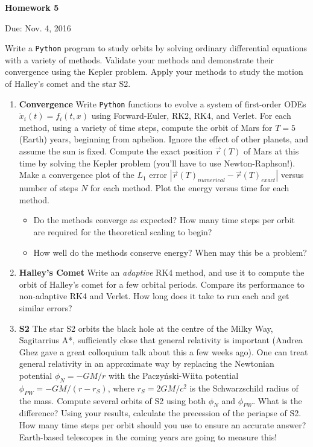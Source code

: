 \documentclass{article}
\newcommand{\Python}{{\texttt{Python}}}
\begin{document}
\begin{center}

\vspace*{-2.5cm}
\LARGE
\bf{Homework 5}
\vspace{1cm}

\large{Due: Nov. 4, 2016}
\vspace{1cm}

\end{center}

Write a \Python{} program to study orbits by solving ordinary differential equations with a variety of methods. Validate your methods and demonstrate their convergence using the Kepler problem. Apply your methods to study the motion of Halley's comet and the star S2.

\begin{enumerate}
	\item {\bf Convergence} 
		Write \Python{} functions to evolve a system of first-order ODEs $\dot{x}_i(t) = f_i(t, x)$ using Forward-Euler, RK2, RK4, and Verlet.  For each method, using a variety of time steps, compute the orbit of Mars for $T=5$ (Earth) years, beginning from aphelion.  Ignore the effect of other planets, and assume the sun is fixed.  Compute the exact position $\vec{r}(T)$ of Mars at this time by solving the Kepler problem (you'll have to use Newton-Raphson!). Make a convergence plot of the $L_1$ error $|\vec{r}(T)_{numerical} - \vec{r}(T)_{exact}|$ versus number of steps $N$ for each method.  Plot the energy versus time for each method.  
		\begin{itemize}
			\item Do the methods converge as expected?  How many time steps per orbit are required for the theoretical scaling to begin?
			\item How well do the methods conserve energy?  When may this be a problem?
		\end{itemize}
	\item {\bf Halley's Comet} 
		Write an \emph{adaptive} RK4 method, and use it to compute the orbit of Halley's comet for a few orbital periods. Compare its performance to non-adaptive RK4 and Verlet.  How long does it take to run each and get similar errors?
	\item {\bf S2} 
		The star S2 orbits the black hole at the centre of the Milky Way, Sagitarrius A*, sufficiently close that general relativity is important (Andrea Ghez gave a great colloquium talk about this a few weeks ago).  One can treat general relativity in an approximate way by replacing the Newtonian potential $\phi_N = -GM/r$ with the Paczy\'{n}ski-Wiita potential $\phi_{PW} = -GM / (r-r_S)$, where $r_S = 2GM/c^2$ is the Schwarzschild radius of the mass.  Compute several orbits of S2 using both $\phi_N$ and $\phi_{PW}$.  What is the difference?  Using your results, calculate the precession of the periapse of S2.  How many time steps per orbit should you use to ensure an accurate answer?  Earth-based telescopes in the coming years are going to measure this!
\end{enumerate}
\end{document}
